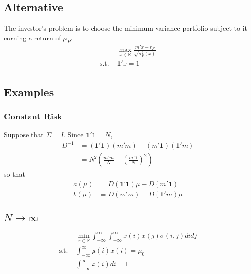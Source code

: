 \documentclass[12pt]{article}
\begin{document}
\subsection{Alternative}
The investor's problem is to choose the minimum-variance portfolio subject to it earning a return of $\mu_{P}$. 
\begin{equation}
	\begin{array}{rl}
		&\max_{x\in\mathbb{R}}\frac{m'x-r_{F}}{\sqrt{\sigma_{P}^{2}(x)}}\\
		\text{s.t. }&\mathbf{1}'x=1\\
	\end{array}
\end{equation}
\subsection{Examples}
\subsubsection{Constant Risk}
Suppose that $\Sigma=I$. Since $\mathbf{1}'\mathbf{1}=N$, 
\begin{align}
	D^{-1}&=\left(\mathbf{1}'\mathbf{1}\right)\left(m'm\right)-\left(m'\mathbf{1}\right)\left(\mathbf{1}'m\right)\\
	&=N^{2}\left(\frac{m'm}{N}-\left(\frac{m'\mathbf{1}}{N}\right)^{2}\right)
\end{align}
so that
\begin{align}
	a(\mu)&=D\left(\mathbf{1}'\mathbf{1}\right)\mu-D\left(m'\mathbf{1}\right)\\
	b(\mu)&=D\left(m'm\right)-D\left(\mathbf{1}'m\right)\mu
\end{align}
\subsection{$N\to\infty$}
\begin{equation}
	\begin{array}{rl}
		&\min_{x\in\mathbb{R}}{\int_{-\infty}^{\infty}{\int_{-\infty}^{\infty}{x(i)x(j)\sigma(i,j)di}dj}}\\
		\text{s.t. }&\int_{-\infty}^{\infty}{\mu(i)x(i)}=\mu_{0}\\
		&\int_{-\infty}^{\infty}{x(i)di}=1
	\end{array}
\end{equation}
\end{document}
